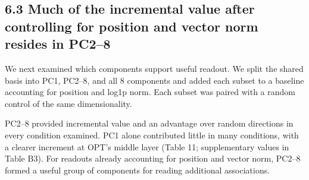 \FloatBarrier

\subsection{6.3 Much of the incremental value after controlling for position and vector norm resides in PC2--8}\label{much-of-the-incremental-value-after-controlling-for-position-and-vector-norm-resides-in-pc28}

We next examined which components support useful readout. We split the shared basis into PC1, PC2--8, and all 8 components and added each subset to a baseline accounting for position and log1p norm. Each subset was paired with a random control of the same dimensionality.

PC2--8 provided incremental value and an advantage over random directions in every condition examined. PC1 alone contributed little in many conditions, with a clearer increment at OPT's middle layer (Table 11; supplementary values in Table B3). For readouts already accounting for position and vector norm, PC2--8 formed a useful group of components for reading additional associations.

